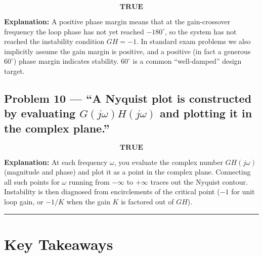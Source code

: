\documentclass[11pt]{article}
\newcommand{\boxedeq}[1]{\boxed{\,#1\,}}
\begin{document}
\[
\boxedeq{\textbf{TRUE}}
\]

\textbf{Explanation:} A positive phase margin means that at the gain-crossover frequency the loop phase
has not yet reached $-180^\circ$, so the system has not reached the instability condition $GH=-1$.
In standard exam problems we also implicitly assume the gain margin is positive, and a positive
(in fact a generous $60^\circ$) phase margin indicates stability. $60^\circ$ is a common
``well-damped'' design target.

\subsection*{Problem 10 --- ``A Nyquist plot is constructed by evaluating $G(j\omega)H(j\omega)$ and plotting it in the complex plane.''}

\[
\boxedeq{\textbf{TRUE}}
\]

\textbf{Explanation:} At each frequency $\omega$, you evaluate the complex number $GH(j\omega)$
(magnitude and phase) and plot it as a point in the complex plane. Connecting all such points
for $\omega$ running from $-\infty$ to $+\infty$ traces out the Nyquist contour. Instability is
then diagnosed from encirclements of the critical point ($-1$ for unit loop gain, or $-1/K$
when the gain $K$ is factored out of $GH$).

\bigskip\hrule\bigskip

\section*{Key Takeaways}
\end{document}
